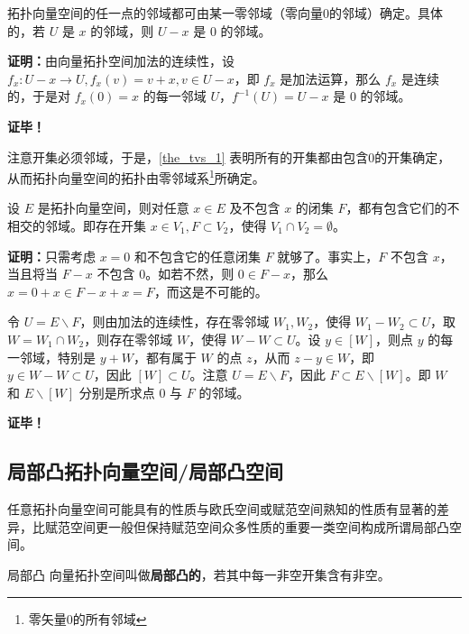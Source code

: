 \begin{theorem}{}\label{the_tvs_1}
拓扑向量空间的任一点的邻域都可由某一零邻域（零向量0的邻域）确定。具体的，若 $U$ 是 $x$ 的邻域，则 $U-x$ 是 $0$ 的邻域。
\end{theorem}

\textbf{证明：}由向量拓扑空间加法的连续性，设 $f_x:U-x\rightarrow U,f_x(v)=v+x,v\in U-x$，即 $f_x$ 是加法运算，那么 $f_x$ 是连续的，于是对 $f_x(0)=x$ 的每一邻域 $U$，$f^{-1}(U)=U-x$ 是 $0$ 的邻域。

\textbf{证毕！}

注意开集必须邻域，于是，\autoref{the_tvs_1} 表明所有的开集都由包含0的开集确定，从而拓扑向量空间的拓扑由零邻域系\footnote{零矢量0的所有邻域}所确定。

\begin{theorem}{}
设 $E$ 是拓扑向量空间，则对任意 $x\in E$ 及不包含 $x$ 的闭集 $F$，都有包含它们的不相交的邻域。即存在开集 $x\in V_1,F\subset V_2$，使得 $V_1\cap V_2=\emptyset$。
\end{theorem}

\textbf{证明：}只需考虑 $x=0$ 和不包含它的任意闭集 $F$ 就够了。事实上，$F$ 不包含 $x$，当且将当 $F-x$ 不包含 0。如若不然，则 $0\in F-x$，那么 $x=0+x\in F-x+x=F$，而这是不可能的。

令 $U=E\backslash F$，则由加法的连续性，存在零邻域 $W_1,W_2$，使得 $W_1-W_2\subset U$，取 $W=W_1\cap W_2$，则存在零邻域 $W$，使得 $W-W\subset U$。设 $y\in [W]$，则点 $y$ 的每一邻域，特别是 $y+W$，都有属于 $W$ 的点 $z$，从而 $z-y\in W$，即 $y\in W-W\subset U$，因此 $[W]\subset U$。注意 $U=E\backslash F$，因此 $F\subset E\backslash [W]$。即 $W$ 和 $E\backslash [W]$ 分别是所求点 $0$ 与 $F$ 的邻域。

\textbf{证毕！}





\subsection{局部凸拓扑向量空间/局部凸空间}
任意拓扑向量空间可能具有的性质与欧氏空间或赋范空间熟知的性质有显著的差异，比赋范空间更一般但保持赋范空间众多性质的重要一类空间构成所谓局部凸空间。


\begin{definition}{局部凸}
向量拓扑空间叫做\textbf{局部凸的}，若其中每一非空开集含有非空。
\end{definition}

